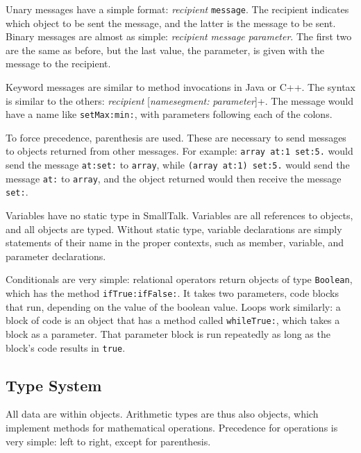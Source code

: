 	Unary messages have a simple format: \emph{recipient} \texttt{message}.  The recipient indicates which object to be sent the message, and the latter is the message to be sent.  Binary messages are almost as simple: \emph{recipient} \emph{message} \emph{parameter}.  The first two are the same as before, but the last value, the parameter, is given with the message to the recipient.

	Keyword messages are similar to method invocations in Java or C++.  The syntax is similar to the others: \emph{recipient} [\emph{namesegment:} \emph{parameter}]+.  The message would have a name like \texttt{setMax:min:}, with parameters following each of the colons.

	To force precedence, parenthesis are used.  These are necessary to send messages to objects returned from other messages.  For example: \texttt{array at:1 set:5.} would send the message \texttt{at:set:} to \texttt{array}, while \texttt{(array at:1) set:5.} would send the message \texttt{at:} to \texttt{array}, and the object returned would then receive the message \texttt{set:}.

	Variables have no static type in SmallTalk.  Variables are all references to objects, and all objects are typed.  Without static type, variable declarations are simply statements of their name in the proper contexts, such as member, variable, and parameter declarations.

	Conditionals are very simple: relational operators return objects of type \texttt{Boolean}, which has the method \texttt{ifTrue:ifFalse:}.  It takes two parameters, code blocks that run, depending on the value of the boolean value.  Loops work similarly: a block of code is an object that has a method called \texttt{whileTrue:}, which takes a block as a parameter.  That parameter block is run repeatedly as long as the block's code results in \texttt{true}.

	

\subsection{Type System}
	All data are within objects.  Arithmetic types are thus also objects, which implement methods for mathematical operations.  Precedence for operations is very simple: left to right, except for parenthesis. 

